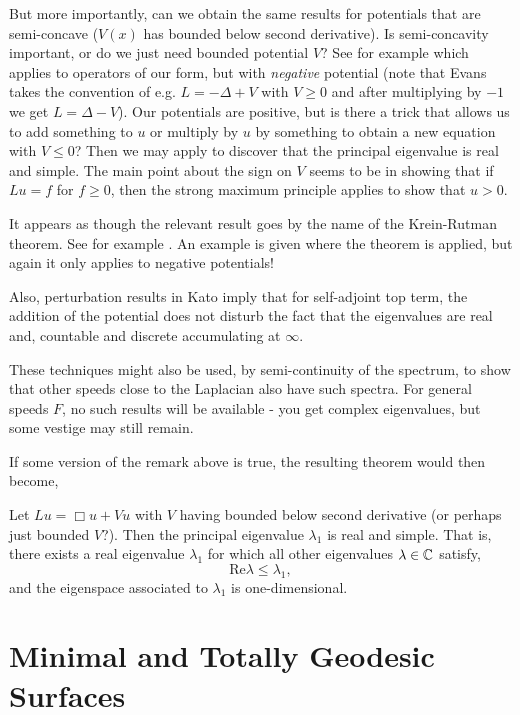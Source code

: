 \documentclass{amsart}
\begin{document}
\begin{rem}
But more importantly, can we obtain the same results for potentials that are semi-concave (\(V(x)\) has bounded below second derivative). Is semi-concavity important, or do we just need bounded potential \(V\)? See for example \cite[Theorem 6.5.3]{Evans:/1998} which applies to operators of our form, but with \emph{negative} potential (note that Evans takes the convention of e.g. \(L = -\Delta + V\) with \(V \geq 0\) and after multiplying by \(-1\) we get \(L = \Delta - V\)). Our potentials are positive, but is there a trick that allows us to add something to \(u\) or multiply by \(u\) by something to obtain a new equation with \(V \leq 0\)? Then we may apply \cite[Theorem 6.5.3]{Evans:/1998} to discover that the principal eigenvalue is real and simple. The main point about the sign on \(V\) seems to be in showing that if \(Lu = f\) for \(f \geq 0\), then the strong maximum principle applies to show that \(u > 0\).

It appears as though the relevant result goes by the name of the Krein-Rutman theorem. See for example \cite[Appendix C, Chapter 11]{smoller:/1983}. An example is given where the theorem is applied, but again it only applies to negative potentials!

Also, perturbation results in Kato imply that for self-adjoint top term, the addition of the potential does not disturb the fact that the eigenvalues are real and, countable and discrete accumulating at \(\infty\).

These techniques might also be used, by semi-continuity of the spectrum, to show that other speeds close to the Laplacian also have such spectra. For general speeds \(F\), no such results will be available - you get complex eigenvalues, but some vestige may still remain.
\end{rem}

If some version of the remark above is true, the resulting theorem would then become,
\begin{thm}
Let \(L u = \Box u + V u\) with \(V\) having bounded below second derivative (or perhaps just bounded \(V\)?). Then the principal eigenvalue \(\lambda_1\) is real and simple. That is, there exists a real eigenvalue \(\lambda_1\) for which all other eigenvalues \(\lambda \in \mathbb{C}\) satisfy,
\[
\text{Re} \lambda \leq \lambda_1,
\]
and the eigenspace associated to \(\lambda_1\) is one-dimensional.
\end{thm}


\section{Minimal and Totally Geodesic Surfaces}
\label{sec:minimal}
\end{document}
